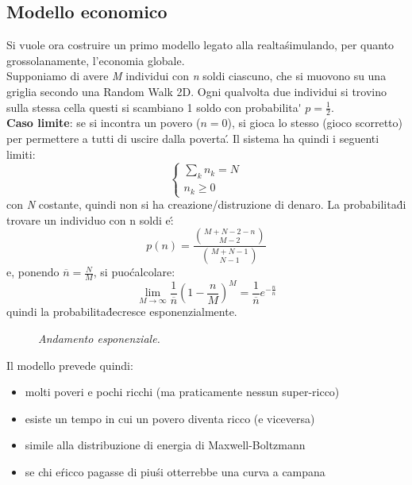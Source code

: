\documentclass[12pt, a4paper]{book}
\theoremstyle{theorem}
\begin{document}
			\subsection{Modello economico}
				Si vuole ora costruire un primo modello legato alla realta\' simulando, per quanto grossolanamente, l'economia globale.\\
				Supponiamo di avere \textit{M} individui con \textit{n} soldi ciascuno, che si muovono su una griglia secondo una Random Walk 2D.
				Ogni qualvolta due individui si trovino sulla stessa cella questi si scambiano 1 soldo con probabilita\' $p=\frac{1}{2}$.\\
				\textbf{Caso limite}: se si incontra un povero ($n=0$), si gioca lo stesso (gioco scorretto) per permettere a tutti di uscire dalla poverta\'.
				Il sistema ha quindi i seguenti limiti:
				\begin{equation*}
					\begin{cases}
						\sum_kn_k=N\\
						n_k\geq 0
					\end{cases}
				\end{equation*}
				con \textit{N} costante, quindi non si ha creazione/distruzione di denaro.
				La probabilita\' di trovare un individuo con n soldi e\':
				\begin{equation*}
					p(n)=\frac{\binom{M+N-2-n}{M-2}}{\binom{M+N-1}{N-1}}
				\end{equation*}
				e, ponendo $\overline{n}=\frac{N}{M}$, si puo\' calcolare:
				\begin{equation}
					\lim_{M\to\infty}\frac{1}{\overline{n}}\left( 1-\frac{n}{M}\right)^M=\frac{1}{\overline{n}}e^{-\frac{n}{\bar{n}}}
				\end{equation}
				quindi la probabilita\' decresce esponenzialmente.\\
				\begin{figure}[H]
					\centering
					\caption{\emph{Andamento esponenziale.}}
					\label{figure:modello_economico}
				\end{figure}
				Il modello prevede quindi:
				\begin{itemize}
					\item molti poveri e pochi ricchi (ma praticamente nessun super-ricco)
					\item esiste un tempo in cui un povero diventa ricco (e viceversa)
					\item simile alla distribuzione di energia di Maxwell-Boltzmann
					\item se chi e\' ricco pagasse di piu\' si otterrebbe una curva a campana
				\end{itemize}
\end{document}
